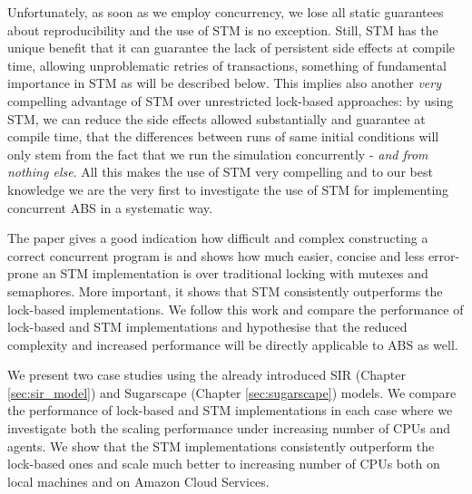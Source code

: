 Unfortunately, as soon as we employ concurrency, we lose all static guarantees about reproducibility and the use of STM is no exception. Still, STM has the unique benefit that it can guarantee the lack of persistent side effects at compile time, allowing unproblematic retries of transactions, something of fundamental importance in STM as will be described below. This implies also another \textit{very} compelling advantage of STM over unrestricted lock-based approaches: by using STM, we can reduce the side effects allowed substantially and guarantee at compile time, that the differences between runs of same initial conditions will only stem from the fact that we run the simulation concurrently - \textit{and from nothing else}. All this makes the use of STM very compelling and to our best knowledge we are the very first to investigate the use of STM for implementing concurrent ABS in a systematic way.

\medskip

The paper \cite{discolo_lock_2006} gives a good indication how difficult and complex constructing a correct concurrent program is and shows how much easier, concise and less error-prone an STM implementation is over traditional locking with mutexes and semaphores. More important, it shows that STM consistently outperforms the lock-based implementations. We follow this work and compare the performance of lock-based and STM implementations and hypothesise that the reduced complexity and increased performance will be directly applicable to ABS as well.

We present two case studies using the already introduced SIR (Chapter \ref{sec:sir_model}) and Sugarscape (Chapter \ref{sec:sugarscape}) models. We compare the performance of lock-based and STM implementations in each case where we investigate both the scaling performance under increasing number of CPUs and agents. We show that the STM implementations consistently outperform the lock-based ones and scale much better to increasing number of CPUs both on local machines and on Amazon Cloud Services.










